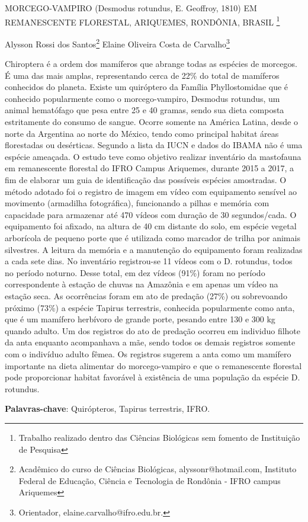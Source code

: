 \documentclass[article,12pt,onesidea,4paper,english,brazil]{abntex2}
\begin{document}
	
	
	\frenchspacing 
	
	\begin{center}
		\LARGE MORCEGO-VAMPIRO (Desmodus rotundus, E. Geoffroy, 1810) EM
		REMANESCENTE FLORESTAL, ARIQUEMES, RONDÔNIA, BRASIL
		\footnote{Trabalho realizado dentro das Ciências Biológicas sem fomento de Instituição de Pesquisa}
		
		\normalsize
		Alysson Rossi dos Santos\footnote{Acadêmico do curso de Ciências Biológicas, alyssonr@hotmail.com, Instituto Federal de Educação,
			Ciência e Tecnologia de Rondônia - IFRO campus Ariquemes} 
		Elaine Oliveira Costa de Carvalho\footnote{Orientador, elaine.carvalho@ifro.edu.br.} 
		
	\end{center}
	
	\noindent Chiroptera é a ordem dos mamíferos que abrange todas as espécies de morcegos.
	É uma das mais amplas, representando cerca de 22\% do total de mamíferos
	conhecidos do planeta. Existe um quiróptero da Família Phyllostomidae que é
	conhecido popularmente como o morcego-vampiro, Desmodus rotundus, um animal
	hematófago que pesa entre 25 e 40 gramas, sendo sua dieta composta estritamente
	do consumo de sangue. Ocorre somente na América Latina, desde o norte da
	Argentina ao norte do México, tendo como principal habitat áreas florestadas ou
	desérticas. Segundo a lista da IUCN e dados do IBAMA não é uma espécie
	ameaçada. O estudo teve como objetivo realizar inventário da mastofauna em
	remanescente florestal do IFRO Campus Ariquemes, durante 2015 a 2017, a fim de
	elaborar um guia de identificação das possíveis espécies amostradas. O método
	adotado foi o registro de imagem em vídeo com equipamento sensível ao movimento
	(armadilha fotográfica), funcionando a pilhas e memória com capacidade para
	armazenar até 470 vídeos com duração de 30 segundos/cada. O equipamento foi
	afixado, na altura de 40 cm distante do solo, em espécie vegetal arborícola de
	pequeno porte que é utilizada como marcador de trilha por animais silvestres. A
	leitura da memória e a manutenção do equipamento foram realizadas a cada sete
	dias. No inventário registrou-se 11 vídeos com o D. rotundus, todos no período
	noturno. Desse total, em dez vídeos (91\%) foram no período correspondente à
	estação de chuvas na Amazônia e em apenas um vídeo na estação seca. As
	ocorrências foram em ato de predação (27\%) ou sobrevoando próximo (73\%) a
	espécie Tapirus terrestris, conhecida popularmente como anta, que é um mamífero
	herbívoro de grande porte, pesando entre 130 e 300 kg quando adulto. Um dos
	registros do ato de predação ocorreu em individuo filhote da anta enquanto
	acompanhava a mãe, sendo todos os demais registros somente com o indivíduo
	adulto fêmea. Os registros sugerem a anta como um mamífero importante na dieta
	alimentar do morcego-vampiro e que o remanescente florestal pode proporcionar
	habitat favorável à existência de uma população da espécie D. rotundus.
	
	\vspace{\onelineskip}
	
	\noindent
	\textbf{Palavras-chave}: Quirópteros, Tapirus terrestris, IFRO.
	
\end{document}
